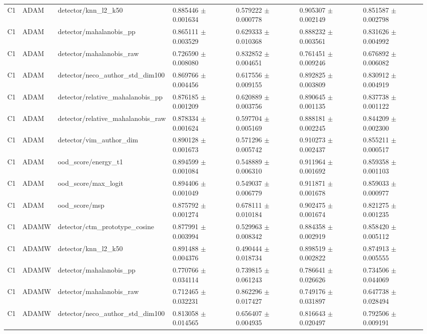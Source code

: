 \begin{longtable}{lllllll}
C1 & ADAM & detector/knn\_l2\_k50 & 0.885446 $\pm$ 0.001634 & 0.579222 $\pm$ 0.000778 & 0.905307 $\pm$ 0.002149 & 0.851587 $\pm$ 0.002798 \\
C1 & ADAM & detector/mahalanobis\_pp & 0.865111 $\pm$ 0.003529 & 0.629333 $\pm$ 0.010368 & 0.888232 $\pm$ 0.003561 & 0.831626 $\pm$ 0.004992 \\
C1 & ADAM & detector/mahalanobis\_raw & 0.726590 $\pm$ 0.008080 & 0.832852 $\pm$ 0.004651 & 0.761451 $\pm$ 0.009246 & 0.676892 $\pm$ 0.006082 \\
C1 & ADAM & detector/neco\_author\_std\_dim100 & 0.869766 $\pm$ 0.004456 & 0.617556 $\pm$ 0.009155 & 0.892825 $\pm$ 0.003809 & 0.830912 $\pm$ 0.004919 \\
C1 & ADAM & detector/relative\_mahalanobis\_pp & 0.876185 $\pm$ 0.001209 & 0.620889 $\pm$ 0.003756 & 0.890645 $\pm$ 0.001135 & 0.837738 $\pm$ 0.001122 \\
C1 & ADAM & detector/relative\_mahalanobis\_raw & 0.878334 $\pm$ 0.001624 & 0.597704 $\pm$ 0.005169 & 0.888181 $\pm$ 0.002245 & 0.844209 $\pm$ 0.002300 \\
C1 & ADAM & detector/vim\_author\_dim & 0.890128 $\pm$ 0.001673 & 0.571296 $\pm$ 0.005742 & 0.910273 $\pm$ 0.002437 & 0.855211 $\pm$ 0.000517 \\
C1 & ADAM & ood\_score/energy\_t1 & 0.894599 $\pm$ 0.001084 & 0.548889 $\pm$ 0.006310 & 0.911964 $\pm$ 0.001692 & 0.859358 $\pm$ 0.001103 \\
C1 & ADAM & ood\_score/max\_logit & 0.894406 $\pm$ 0.001049 & 0.549037 $\pm$ 0.006779 & 0.911871 $\pm$ 0.001678 & 0.859033 $\pm$ 0.000977 \\
C1 & ADAM & ood\_score/msp & 0.875792 $\pm$ 0.001274 & 0.678111 $\pm$ 0.010184 & 0.902475 $\pm$ 0.001674 & 0.821275 $\pm$ 0.001235 \\
C1 & ADAMW & detector/ctm\_prototype\_cosine & 0.877991 $\pm$ 0.003994 & 0.529963 $\pm$ 0.008342 & 0.884358 $\pm$ 0.002919 & 0.858420 $\pm$ 0.005112 \\
C1 & ADAMW & detector/knn\_l2\_k50 & 0.891488 $\pm$ 0.004376 & 0.490444 $\pm$ 0.018734 & 0.898519 $\pm$ 0.002822 & 0.874913 $\pm$ 0.005555 \\
C1 & ADAMW & detector/mahalanobis\_pp & 0.770766 $\pm$ 0.034114 & 0.739815 $\pm$ 0.061243 & 0.786641 $\pm$ 0.026626 & 0.734506 $\pm$ 0.044069 \\
C1 & ADAMW & detector/mahalanobis\_raw & 0.712465 $\pm$ 0.032231 & 0.862296 $\pm$ 0.017427 & 0.749176 $\pm$ 0.031897 & 0.647738 $\pm$ 0.028494 \\
C1 & ADAMW & detector/neco\_author\_std\_dim100 & 0.813058 $\pm$ 0.014565 & 0.656407 $\pm$ 0.004935 & 0.816643 $\pm$ 0.020497 & 0.792506 $\pm$ 0.009191 \\

\end{longtable}
